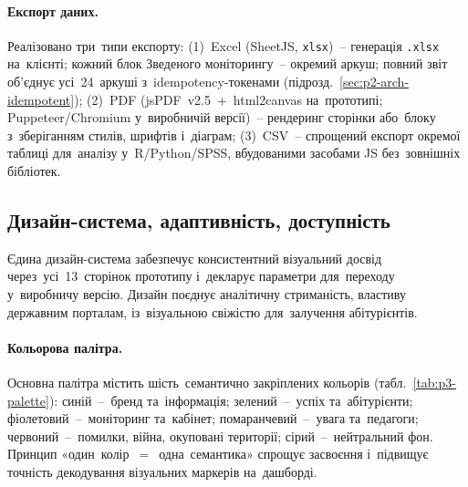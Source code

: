 \paragraph{Експорт даних.} Реалізовано три~типи експорту: (1)~Excel (SheetJS, \texttt{xlsx})~-- генерація \texttt{.xlsx} на~клієнті; кожний блок Зведеного моніторингу~-- окремий аркуш; повний звіт об'єднує усі~24~аркуші з~idempotency-токенами (підрозд.~\ref{sec:p2-arch-idempotent}); (2)~PDF (jsPDF~v2.5~+~html2canvas на~прототипі; Puppeteer/Chromium у~виробничій версії)~-- рендеринг сторінки або~блоку з~зберіганням стилів, шрифтів і~діаграм; (3)~CSV~-- спрощений експорт окремої таблиці для~аналізу у~R/Python/SPSS, вбудованими засобами JS без~зовнішніх бібліотек.

\subsection{Дизайн-система, адаптивність, доступність}
\label{sec:p3-design}

Єдина дизайн-система забезпечує консистентний візуальний досвід через~усі~13~сторінок прототипу і~декларує параметри для~переходу у~виробничу версію. Дизайн поєднує аналітичну стриманість, властиву державним порталам, із~візуальною свіжістю для~залучення абітурієнтів.

\paragraph{Кольорова палітра.} Основна палітра містить шість~семантично закріплених кольорів (табл.~\ref{tab:p3-palette}): синій~--~бренд та~інформація; зелений~--~успіх та~абітурієнти; фіолетовий~--~моніторинг та~кабінет; помаранчевий~--~увага та~педагоги; червоний~--~помилки, війна, окуповані території; сірий~--~нейтральний фон. Принцип «один~колір~$=$~одна~семантика» спрощує засвоєння і~підвищує точність декодування візуальних маркерів на~дашборді.

